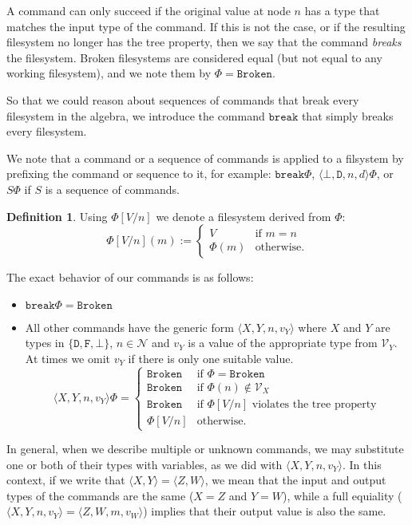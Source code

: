 \documentclass[12pt]{article}
\newcommand{\setvx}[1]{\mathcal{V}_{#1}} %
\newcommand{\setn}{\mathcal{N}} %
\newcommand{\empt}{\bot}
\newcommand{\fsbroken}{\mathtt{Broken}} %
\newcommand{\FS}{\Phi} %
\newcommand{\cbrk}{\mathtt{break}} %
\newcommand{\ccharb}{\empt}
\newcommand{\ccharf}{\mathtt{F}}
\newcommand{\cchard}{\mathtt{D}}
\newcommand{\vald}{d} %
\newcommand{\valvy}{v_Y} %
\newcommand{\valvw}{v_W}
\newcommand{\typeset}{\{\cchard,\ccharf,\ccharb\}} %
\newcommand{\caa}[2]{\langle{#1,#2}\rangle}
\newcommand{\caaaa}[4]{\langle{#1,#2,#3,#4}\rangle}
\newcommand{\cbdaa}[2]{\caaaa{\ccharb}{\cchard}{#1}{#2}}
\newcommand{\cxy}{\caa{X}{Y}}
\newcommand{\cxynv}{\caaaa{X}{Y}{n}{\valvy}}
\newcommand{\czw}{\caa{Z}{W}}
\newcommand{\czwmv}{\caaaa{Z}{W}{m}{\valvw}}
\theoremstyle{definition}
\newtheorem{mydef}{Definition}
\begin{document}
A command can only succeed if the original value at node $n$ has a type that matches
the input type of the command. If this is not the case, or if the resulting
filesystem no longer has the tree property, then we say that the command
{\em breaks} the filesystem. Broken filesystems are considered equal
(but not equal to any working filesystem), and we note them by $\FS=\fsbroken$.

So that we could reason about sequences of commands that break every filesystem
in the algebra, we introduce the command $\cbrk$ that simply breaks every filesystem.

We note that a command or a sequence of commands is applied to a filsystem
by prefixing the command or sequence to it, for example: $\cbrk\FS$, $\cbdaa{n}{\vald}\FS$, 
or $S\FS$ if $S$ is a sequence of commands.

\begin{mydef}
Using $\FS[V/n]$ we denote a filesystem derived from $\FS$:
\[ \FS[V/n](m) :=
   \begin{cases}
   V &\mbox{if~} m=n\\
   \FS(m) &\mbox{otherwise.}
   \end{cases}
\]
\end{mydef}

The exact behavior of our commands is as follows:
\begin{itemize}
\item $\cbrk\FS = \fsbroken$
\item
All other commands have the generic form $\cxynv$ where
$X$ and $Y$ are types in $\typeset$,
$n\in\setn$ and $\valvy$ is a value of the appropriate type from $\setvx{Y}$.
At times we omit $\valvy$ if there is only one suitable value.
\[ \cxynv\FS = 
   \begin{cases}
   \fsbroken &\mbox{if~} \FS=\fsbroken\\
   \fsbroken &\mbox{if~} \FS(n)\not\in\setvx{X}\\
   \fsbroken &\mbox{if~} \FS[V/n] \mbox{~violates the tree property}\\
   \FS[V/n] &\mbox{otherwise.}
   \end{cases}
\]
\end{itemize}


In general, when we describe multiple or unknown commands, we may substitute one or both
of their types with variables, as we did with $\cxynv$. In this context,
if we write that $\cxy=\czw$, we mean that the input and output types %
of the commands are the same ($X=Z$ and $Y=W$), while a full equiality 
($\cxynv=\czwmv$)
implies
that their output value is also the same.
\end{document}
